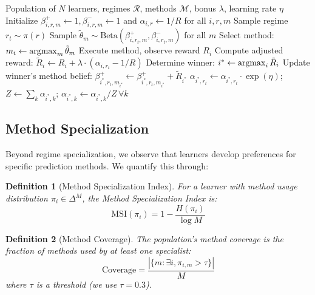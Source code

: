 \documentclass{article}
\newtheorem{definition}{Definition}
\newcommand{\MSI}{\text{MSI}}
\newcommand{\argmax}{\operatornamewithlimits{argmax}}
\begin{document}
\begin{algorithm}[t]
\caption{GAUSE}
\label{alg:niche}
\begin{algorithmic}[1]
\REQUIRE Population of $N$ learners, regimes $\mathcal{R}$, methods $\mathcal{M}$, bonus $\lambda$, learning rate $\eta$
\STATE Initialize $\beta_{i,r,m}^+ \leftarrow 1, \beta_{i,r,m}^- \leftarrow 1$ and $\alpha_{i,r} \leftarrow 1/R$ for all $i, r, m$
    \STATE Sample regime $r_t \sim \pi(r)$
        \STATE Sample $\tilde{\theta}_m \sim \text{Beta}(\beta_{i,r_t,m}^+, \beta_{i,r_t,m}^-)$ for all $m$
        \STATE Select method: $m_i \leftarrow \argmax_m \tilde{\theta}_m$
        \STATE Execute method, observe reward $R_i$
        \STATE Compute adjusted reward: $\tilde{R}_i \leftarrow R_i + \lambda \cdot (\alpha_{i,r_t} - 1/R)$
    \ENDFOR
    \STATE Determine winner: $i^* \leftarrow \argmax_i \tilde{R}_i$
    \STATE Update winner's method belief: $\beta_{i^*,r_t,m_{i^*}}^+ \leftarrow \beta_{i^*,r_t,m_{i^*}}^+ + \tilde{R}_{i^*}$
    \STATE {}
    \STATE $\alpha_{i^*,r_t} \leftarrow \alpha_{i^*,r_t} \cdot \exp(\eta)$; \quad $Z \leftarrow \sum_{k} \alpha_{i^*,k}$; \quad $\alpha_{i^*,k} \leftarrow \alpha_{i^*,k} / Z \,\forall k$
\ENDFOR
\end{algorithmic}
\end{algorithm}

\subsection{Method Specialization}

Beyond regime specialization, we observe that learners develop preferences for specific prediction methods. We quantify this through:

\begin{definition}[Method Specialization Index]
For a learner with method usage distribution $\pi_i \in \Delta^M$, the Method Specialization Index is:
\begin{equation}
    \MSI(\pi_i) = 1 - \frac{H(\pi_i)}{\log M}
\end{equation}
\end{definition}

\begin{definition}[Method Coverage]
The population's method coverage is the fraction of methods used by at least one specialist:
\begin{equation}
    \text{Coverage} = \frac{|\{m : \exists i, \pi_{i,m} > \tau\}|}{M}
\end{equation}
where $\tau$ is a threshold (we use $\tau = 0.3$).
\end{definition}
\end{document}
